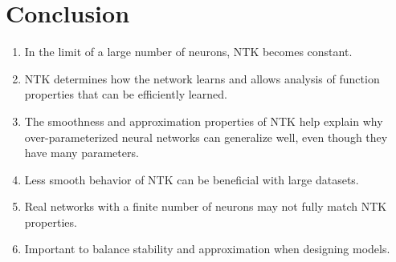 \documentclass{beamer}
\begin{document}
\section{Conclusion}
\begin{frame}
\begin{enumerate}
    \item In the limit of a large number of neurons, NTK becomes constant.

    \item NTK determines how the network learns and allows analysis of function properties that can be efficiently learned.

    \item The smoothness and approximation properties of NTK help explain why over-parameterized neural networks can generalize well, even though they have many parameters.

    \item Less smooth behavior of NTK can be beneficial with large datasets.

    \item Real networks with a finite number of neurons may not fully match NTK properties.

    \item Important to balance stability and approximation when designing models.
\end{enumerate}
\end{frame}
\end{document}
